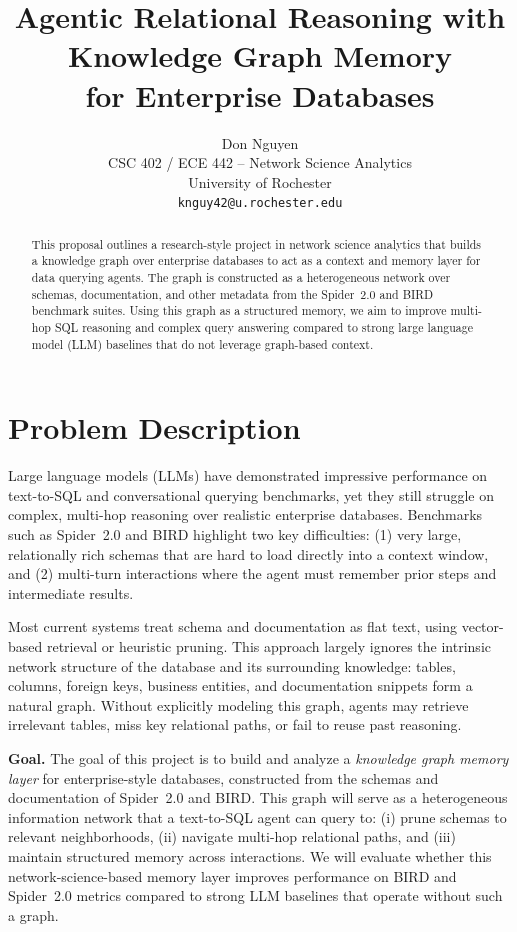 \documentclass[11pt]{article}
\title{
Agentic Relational Reasoning with Knowledge Graph Memory \\
for Enterprise Databases
}
\author{
  Don Nguyen \\
  CSC 402 / ECE 442 -- Network Science Analytics \\
  University of Rochester \\
  \texttt{knguy42@u.rochester.edu}
}
\begin{document}
\maketitle

\begin{abstract}
This proposal outlines a research-style project in network science analytics that builds a knowledge graph over enterprise databases to act as a context and memory layer for data querying agents.
The graph is constructed as a heterogeneous network over schemas, documentation, and other metadata from the Spider~2.0 and BIRD benchmark suites.
Using this graph as a structured memory, we aim to improve multi-hop SQL reasoning and complex query answering compared to strong large language model (LLM) baselines that do not leverage graph-based context.
\end{abstract}

\section{Problem Description}

Large language models (LLMs) have demonstrated impressive performance on text-to-SQL and conversational querying benchmarks, yet they still struggle on complex, multi-hop reasoning over realistic enterprise databases.
Benchmarks such as Spider~2.0 and BIRD highlight two key difficulties:
(1) very large, relationally rich schemas that are hard to load directly into a context window, and
(2) multi-turn interactions where the agent must remember prior steps and intermediate results.

Most current systems treat schema and documentation as flat text, using vector-based retrieval or heuristic pruning.
This approach largely ignores the intrinsic network structure of the database and its surrounding knowledge: tables, columns, foreign keys, business entities, and documentation snippets form a natural graph.
Without explicitly modeling this graph, agents may retrieve irrelevant tables, miss key relational paths, or fail to reuse past reasoning.

\textbf{Goal.}
The goal of this project is to build and analyze a \emph{knowledge graph memory layer} for enterprise-style databases, constructed from the schemas and documentation of Spider~2.0 and BIRD.
This graph will serve as a heterogeneous information network that a text-to-SQL agent can query to:
(i) prune schemas to relevant neighborhoods,
(ii) navigate multi-hop relational paths,
and (iii) maintain structured memory across interactions.
We will evaluate whether this network-science-based memory layer improves performance on BIRD and Spider~2.0 metrics compared to strong LLM baselines that operate without such a graph.
\end{document}
